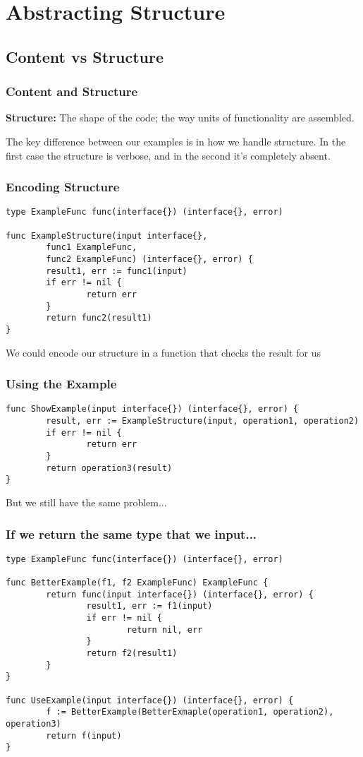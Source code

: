 \documentclass{beamer}
\begin{document}
\section{Abstracting Structure}
\subsection{Content vs Structure}

\begin{frame}
  \frametitle{Content and Structure}
  {\bf Structure:} The shape of the code; the way units of functionality are assembled.

  \vfill

  The key difference between our examples is in how we handle
  structure.  In the first case the structure is verbose, and in the
  second it's completely absent.

  \vfill
\end{frame}

\begin{frame}[fragile]
  \frametitle{Encoding Structure}
\begin{lstlisting}
type ExampleFunc func(interface{}) (interface{}, error)

func ExampleStructure(input interface{},
        func1 ExampleFunc,
        func2 ExampleFunc) (interface{}, error) {
        result1, err := func1(input)
        if err != nil {
                return err
        }
        return func2(result1)
}
\end{lstlisting}
  \vfill
  We could encode our structure in a function that checks the result for us
\end{frame}

\begin{frame}[fragile]
  \frametitle{Using the Example}
\begin{lstlisting}
func ShowExample(input interface{}) (interface{}, error) {
        result, err := ExampleStructure(input, operation1, operation2)
        if err != nil {
                return err
        }
        return operation3(result)
}
\end{lstlisting}
  \vfill
  But we still have the same problem...
\end{frame}

\begin{frame}[fragile]
  \frametitle{If we return the same type that we input...}
\begin{lstlisting}
type ExampleFunc func(interface{}) (interface{}, error)

func BetterExample(f1, f2 ExampleFunc) ExampleFunc {
        return func(input interface{}) (interface{}, error) {
                result1, err := f1(input)
                if err != nil {
                        return nil, err
                }
                return f2(result1)
        }
}

func UseExample(input interface{}) (interface{}, error) {
        f := BetterExample(BetterExmaple(operation1, operation2), operation3)
        return f(input)
}
\end{lstlisting}
\end{frame}
\end{document}
